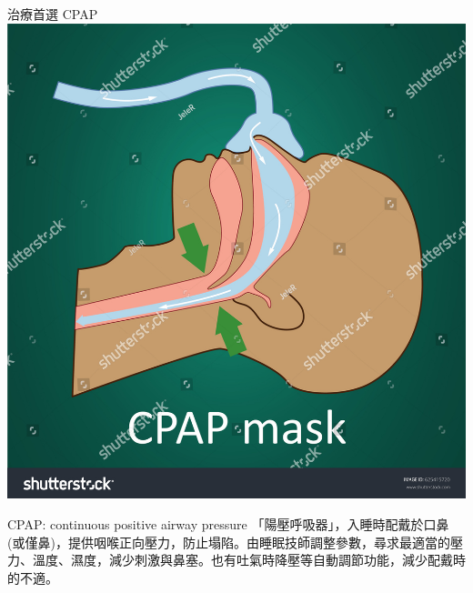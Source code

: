 \documentclass[aspectratio=169]{beamer}
\begin{document}
\begin{frame}{治療首選 CPAP}
    \centering
    \includegraphics[height=0.30\textwidth]{stock-vector-vector-illustration-of-normal-breathing-with-cpap-mask-625415720.jpg}
    
    \begin{block}{CPAP: continuous positive airway pressure}
    「陽壓呼吸器」，入睡時配戴於口鼻(或僅鼻)，提供咽喉正向壓力，防止塌陷。由睡眠技師調整參數，尋求最適當的壓力、溫度、濕度，減少刺激與鼻塞。也有吐氣時降壓等自動調節功能，減少配戴時的不適。
    \end{block}

\end{frame}
\end{document}
